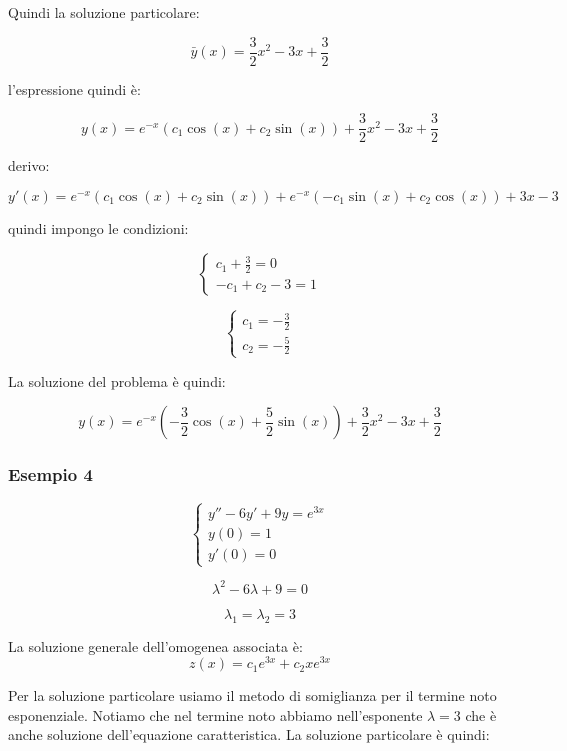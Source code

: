 Quindi la soluzione particolare:

\[
    \bar{y} (x) = \frac{3}{2}x^{2}-3x+\frac{3}{2}
\]


l'espressione quindi è:

\[
    y(x) = e ^{-x}(c_1 \cos(x) + c_2 \sin(x) ) + \frac{3}{2}x^{2}-3x+\frac{3}{2}
\]

derivo:

\[
    y'(x) = e ^{-x}(c_1 \cos(x)+ c_2 \sin(x)) + e ^{-x}(-c_1\sin(x)+c_2 \cos(x)) +3x -3
\]

quindi impongo le condizioni:

\begin{equation*}
    \begin{cases*}
        c_1 +\frac{3}{2}=0 \\
        -c_1+c_2 -3 = 1
    \end{cases*}
\end{equation*}

\begin{equation*}
    \begin{cases*}
        c_1=-\frac{3}{2} \\
        c_2=-\frac{5}{2}
    \end{cases*}
\end{equation*}

La soluzione del problema è quindi:

\[
    y(x) = e ^{-x}(-\frac{3}{2}\cos(x) + \frac{5}{2} \sin(x)) + \frac{3}{2}x^{2}-3x + \frac{3}{2}
\]

\filbreak{}
\subsubsection*{Esempio 4}

\begin{equation*}
    \begin{cases*}
        y''-6y' + 9y = e ^{3x} \\
        y(0) = 1               \\
        y'(0) = 0
    \end{cases*}
\end{equation*}

\[
    \lambda^{2} -6 \lambda + 9 = 0
\]

\[
    \lambda_1=\lambda_2=3
\]

La soluzione generale dell'omogenea associata è:
\[
    z(x)  = c_1 e ^{3x}+ c_2 x e ^{3x}
\]

Per la soluzione particolare usiamo il metodo di somiglianza per il termine noto esponenziale. Notiamo che nel termine noto abbiamo nell'esponente \(\lambda=3\) che è anche soluzione dell'equazione caratteristica. La soluzione particolare è quindi:

